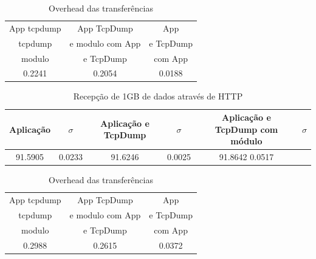 \documentclass[a4paper]{llncs}
\begin{document}
\begin{table}
\begin{center}
\caption{Overhead das transferências}
\begin{tabular}{ | c | c | c  | }
\hline
\hspace {1cm} App tcpdump \hspace {1cm}  & \hspace{1cm} App TcpDump  \hspace{1cm} & \hspace{1cm} App \hspace{1cm}  \\
tcpdump & e modulo com App & e TcpDump\\
modulo & e TcpDump & com App \\
\hline
0.2241 & 
0.2054 & 
0.0188 \\
\hline
\end{tabular}
\end{center}
\end{table}

\begin{table}
\begin{center}
\caption{Recepção de 1GB de dados através de HTTP}
\begin{tabular}{ | c | c | c |c | c | c | }
\hline
Aplicação & $\sigma$ & Aplicação e TcpDump & $\sigma$ & Aplicação e TcpDump com módulo &  $\sigma$ \\
\hline
91.5905	& 0.0233 &
91.6246	& 0.0025 &
91.8642	0.0517 \\
\hline
\end{tabular}
\end{center}
\end{table}


\begin{table}
\begin{center}
\caption{Overhead das transferências}
\begin{tabular}{ | c | c | c  | }
\hline
\hspace {1cm} App tcpdump \hspace {1cm}  & \hspace{1cm} App TcpDump  \hspace{1cm} & \hspace{1cm} App \hspace{1cm}  \\
tcpdump & e modulo com App & e TcpDump\\
modulo & e TcpDump & com App \\
\hline
0.2988 & 
0.2615 & 
0.0372\\
\hline
\end{tabular}
\end{center}
\end{table}
\end{document}
